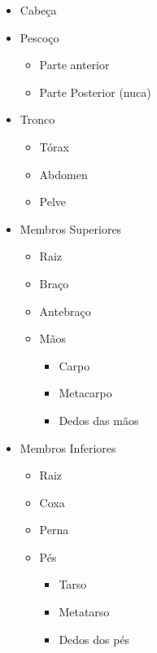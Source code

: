 \documentclass[
]{book}
\providecommand{\tightlist}{%
  \setlength{\itemsep}{0pt}\setlength{\parskip}{0pt}}
\begin{document}
\begin{itemize}
\tightlist
\item
  Cabeça
\item
  Pescoço

  \begin{itemize}
  \tightlist
  \item
    Parte anterior
  \item
    Parte Posterior (nuca)
  \end{itemize}
\item
  Tronco

  \begin{itemize}
  \tightlist
  \item
    Tórax
  \item
    Abdomen
  \item
    Pelve
  \end{itemize}
\item
  Membros Superiores

  \begin{itemize}
  \tightlist
  \item
    Raiz
  \item
    Braço
  \item
    Antebraço
  \item
    Mãos

    \begin{itemize}
    \tightlist
    \item
      Carpo
    \item
      Metacarpo
    \item
      Dedos das mãos
    \end{itemize}
  \end{itemize}
\item
  Membros Inferiores

  \begin{itemize}
  \tightlist
  \item
    Raiz
  \item
    Coxa
  \item
    Perna
  \item
    Pés

    \begin{itemize}
    \tightlist
    \item
      Tarso
    \item
      Metatarso
    \item
      Dedos dos pés
    \end{itemize}
  \end{itemize}
\end{itemize}
\end{document}
